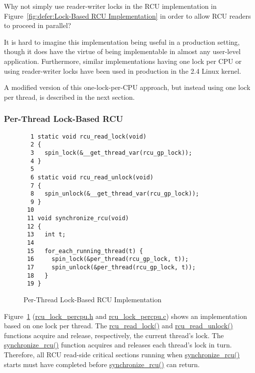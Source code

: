 \QuickQuiz{}
	Why not simply use reader-writer locks in the RCU implementation
	in
	Figure~\ref{fig:defer:Lock-Based RCU Implementation}
	in order to allow RCU readers to proceed in parallel?
 \QuickQuizEnd

It is hard to imagine this implementation being useful
in a production setting, though it does have the virtue
of being implementable in almost any user-level application.
Furthermore, similar implementations having one lock per CPU
or using reader-writer locks have been used in production
in the 2.4 Linux kernel.

A modified version of this one-lock-per-CPU approach, but instead using
one lock per thread, is described
in the next section.

\subsubsection{Per-Thread Lock-Based RCU}
\label{defer:Per-Thread Lock-Based RCU}

\begin{figure}[bp]
{ \scriptsize
\begin{verbatim}
  1 static void rcu_read_lock(void)
  2 {
  3   spin_lock(&__get_thread_var(rcu_gp_lock));
  4 }
  5 
  6 static void rcu_read_unlock(void)
  7 {
  8   spin_unlock(&__get_thread_var(rcu_gp_lock));
  9 }
 10 
 11 void synchronize_rcu(void)
 12 {
 13   int t;
 14 
 15   for_each_running_thread(t) {
 16     spin_lock(&per_thread(rcu_gp_lock, t));
 17     spin_unlock(&per_thread(rcu_gp_lock, t));
 18   }
 19 }
\end{verbatim}
}
\caption{Per-Thread Lock-Based RCU Implementation}
\label{fig:defer:Per-Thread Lock-Based RCU Implementation}
\end{figure}

Figure~\ref{fig:defer:Per-Thread Lock-Based RCU Implementation}
(\url{rcu_lock_percpu.h} and \url{rcu_lock_percpu.c})
shows an implementation based on one lock per thread.
The \url{rcu_read_lock()} and \url{rcu_read_unlock()} functions
acquire and release, respectively, the current thread's lock.
The \url{synchronize_rcu()} function acquires and releases each thread's
lock in turn.
Therefore, all RCU read-side critical sections running
when \url{synchronize_rcu()} starts must have completed before
\url{synchronize_rcu()} can return.

